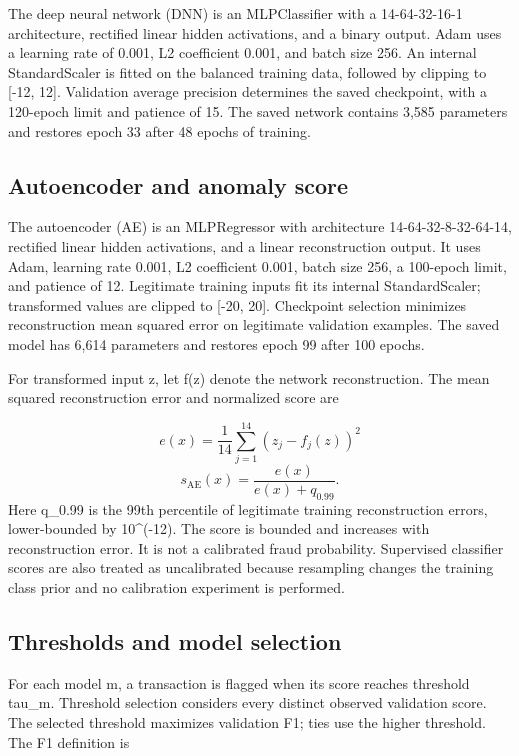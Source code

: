 \documentclass[conference]{IEEEtran}
\begin{document}
The deep neural network (DNN) is an MLPClassifier with a 14-64-32-16-1 architecture, rectified linear hidden activations, and a binary output. Adam uses a learning rate of 0.001, L2 coefficient 0.001, and batch size 256. An internal StandardScaler is fitted on the balanced training data, followed by clipping to [-12, 12]. Validation average precision determines the saved checkpoint, with a 120-epoch limit and patience of 15. The saved network contains 3,585 parameters and restores epoch 33 after 48 epochs of training.

\subsection{Autoencoder and anomaly score}
The autoencoder (AE) is an MLPRegressor with architecture 14-64-32-8-32-64-14, rectified linear hidden activations, and a linear reconstruction output. It uses Adam, learning rate 0.001, L2 coefficient 0.001, batch size 256, a 100-epoch limit, and patience of 12. Legitimate training inputs fit its internal StandardScaler; transformed values are clipped to [-20, 20]. Checkpoint selection minimizes reconstruction mean squared error on legitimate validation examples. The saved model has 6,614 parameters and restores epoch 99 after 100 epochs.

For transformed input z, let f(z) denote the network reconstruction. The mean squared reconstruction error and normalized score are

\begin{equation}
e(x)=\frac{1}{14}\sum_{j=1}^{14}(z_j-f_j(z))^2
\end{equation}
\begin{equation}
s_{\mathrm{AE}}(x)=\frac{e(x)}{e(x)+q_{0.99}}.
\end{equation}
Here q\_0.99 is the 99th percentile of legitimate training reconstruction errors, lower-bounded by 10\textasciicircum{}(-12). The score is bounded and increases with reconstruction error. It is not a calibrated fraud probability. Supervised classifier scores are also treated as uncalibrated because resampling changes the training class prior and no calibration experiment is performed.

\subsection{Thresholds and model selection}
For each model m, a transaction is flagged when its score reaches threshold tau\_m. Threshold selection considers every distinct observed validation score. The selected threshold maximizes validation F1; ties use the higher threshold. The F1 definition is
\end{document}

